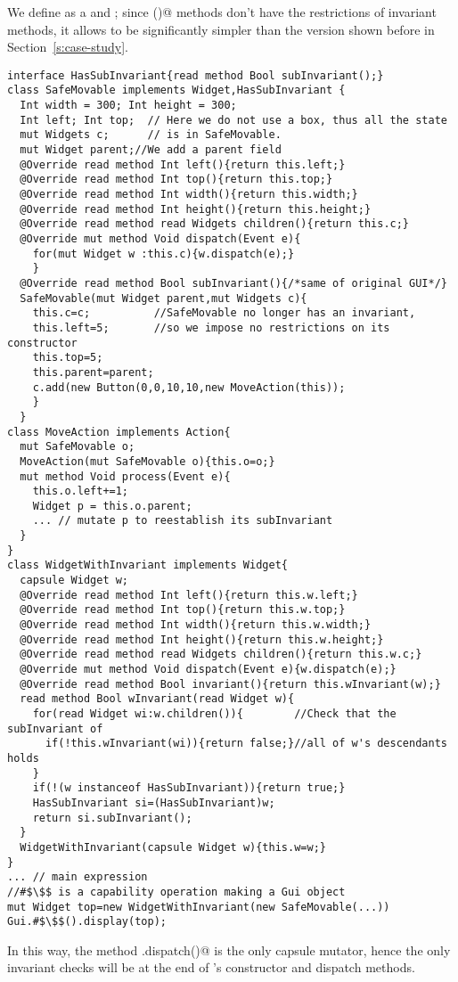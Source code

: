 We define \Q@SafeMovable@ as a \Q@Widget@ and \Q@HasSubInvariant@; since \Q@subInvariant()@ methods don't have the restrictions of invariant methods, it allows \Q@SafeMovable@ to be significantly simpler than the version shown before in Section~\ref{s:case-study}.
\begin{lstlisting}
interface HasSubInvariant{read method Bool subInvariant();}
class SafeMovable implements Widget,HasSubInvariant {
  Int width = 300; Int height = 300;
  Int left; Int top;  // Here we do not use a box, thus all the state
  mut Widgets c;      // is in SafeMovable.
  mut Widget parent;//We add a parent field
  @Override read method Int left(){return this.left;}
  @Override read method Int top(){return this.top;}
  @Override read method Int width(){return this.width;}
  @Override read method Int height(){return this.height;}
  @Override read method read Widgets children(){return this.c;}
  @Override mut method Void dispatch(Event e){
    for(mut Widget w :this.c){w.dispatch(e);}
    }
  @Override read method Bool subInvariant(){/*same of original GUI*/}
  SafeMovable(mut Widget parent,mut Widgets c){
    this.c=c;          //SafeMovable no longer has an invariant,
    this.left=5;       //so we impose no restrictions on its constructor
    this.top=5;
    this.parent=parent;
    c.add(new Button(0,0,10,10,new MoveAction(this));
    }
  }
class MoveAction implements Action{
  mut SafeMovable o;
  MoveAction(mut SafeMovable o){this.o=o;}
  mut method Void process(Event e){
    this.o.left+=1;
    Widget p = this.o.parent;
    ... // mutate p to reestablish its subInvariant
  }
}
class WidgetWithInvariant implements Widget{
  capsule Widget w;
  @Override read method Int left(){return this.w.left;}
  @Override read method Int top(){return this.w.top;}
  @Override read method Int width(){return this.w.width;}
  @Override read method Int height(){return this.w.height;}
  @Override read method read Widgets children(){return this.w.c;}
  @Override mut method Void dispatch(Event e){w.dispatch(e);}
  @Override read method Bool invariant(){return this.wInvariant(w);}
  read method Bool wInvariant(read Widget w){
    for(read Widget wi:w.children()){        //Check that the subInvariant of
      if(!this.wInvariant(wi)){return false;}//all of w's descendants holds
    }
    if(!(w instanceof HasSubInvariant)){return true;}
    HasSubInvariant si=(HasSubInvariant)w;
    return si.subInvariant();
  }
  WidgetWithInvariant(capsule Widget w){this.w=w;}
}
... // main expression
//#$\$$ is a capability operation making a Gui object
mut Widget top=new WidgetWithInvariant(new SafeMovable(...))
Gui.#$\$$().display(top);
\end{lstlisting}
In this way, the method \Q@WidgetWithInvariant.dispatch()@ is the only capsule mutator, hence the only invariant checks will be at the end of \Q@WidgetWithInvariant@'s constructor and dispatch methods.

